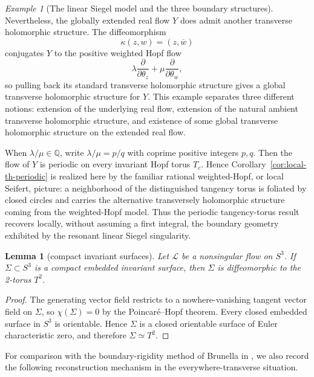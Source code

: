 \documentclass[11pt,reqno]{article}
\newtheorem{lemma}[theorem]{Lemma}
\theoremstyle{remark}
\newtheorem{exe}[theorem]{Example}
\newcommand{\pd}{\partial}
\newcommand{\ol}{\overline}
\begin{document}
\begin{exe}[The linear Siegel model and the three boundary structures]
Nevertheless, the globally extended real flow $Y$ does admit another transverse holomorphic structure. The diffeomorphism
\[
 \kappa(z,w)=(z,\ol w)
\]
conjugates $Y$ to the positive weighted Hopf flow
\[
 \lambda\frac{\pd}{\pd\theta_z}+\mu\frac{\pd}{\pd\theta_w},
\]
so pulling back its standard transverse holomorphic structure gives a global transverse holomorphic structure for $Y$. This example separates three different notions: extension of the underlying real flow, extension of the natural ambient transverse holomorphic structure, and existence of some global transverse holomorphic structure on the extended real flow.

When $\lambda/\mu\in\mathbb Q$, write $\lambda/\mu=p/q$ with coprime positive integers $p,q$. Then the flow of $Y$ is periodic on every invariant Hopf torus $T_c$. Hence Corollary~\ref{cor:local-th-periodic} is realized here by the familiar rational weighted-Hopf, or local Seifert, picture: a neighborhood of the distinguished tangency torus is foliated by closed circles and carries the alternative transversely holomorphic structure coming from the weighted-Hopf model. Thus the periodic tangency-torus result recovers locally, without assuming a first integral, the boundary geometry exhibited by the resonant linear Siegel singularity.

\end{exe}


\begin{lemma}[compact invariant surfaces]\label{lem:compact-surface}
Let $\mathcal L$ be a nonsingular flow on $S^3$. If $\Sigma\subset S^3$ is a compact embedded invariant surface, then $\Sigma$ is diffeomorphic to the 2-torus $T^2$.
\end{lemma}

\begin{proof}
The generating vector field restricts to a nowhere-vanishing tangent vector field on $\Sigma$, so $\chi(\Sigma)=0$ by the Poincar\'e--Hopf theorem. Every closed embedded surface in $S^3$ is orientable. Hence $\Sigma$ is a closed orientable surface of Euler characteristic zero, and therefore $\Sigma\simeq T^2$.
\end{proof}

For comparison with the boundary-rigidity method of Brunella in \cite{Brunella1995}, we also record the following reconstruction mechanism in the everywhere-transverse situation.
\end{document}
